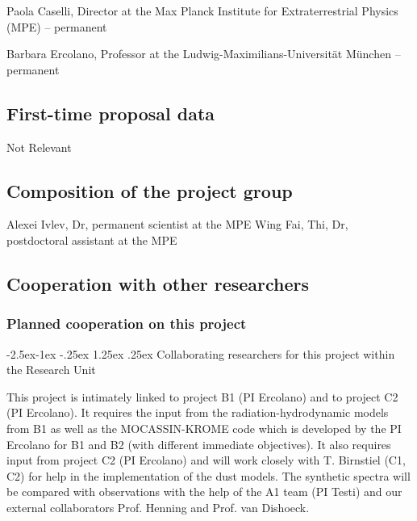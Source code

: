\documentclass[10pt,fleqn,twoside]{article}
\makeatletter
\newcommand{\Tcol}{\color{blue}}
\renewcommand\paragraph{\@startsection{paragraph}{4}{\z@}%
            {-2.5ex\@plus -1ex \@minus -.25ex}%
            {1.25ex \@plus .25ex}%
            {\normalfont\normalsize\bfseries}}
\makeatother
\begin{document}
Paola Caselli, Director at the Max Planck Institute for Extraterrestrial Physics (MPE) -- permanent 

Barbara Ercolano, Professor at the Ludwig-Maximilians-Universit\"at
M\"unchen -- permanent

\subsection{\Tcol First-time proposal data}

Not Relevant

\subsection{\Tcol Composition of the project group}

Alexei Ivlev, Dr, permanent scientist at the MPE 
Wing Fai, Thi, Dr, postdoctoral assistant at the MPE

\subsection{\Tcol Cooperation with other researchers}

\subsubsection{\Tcol Planned cooperation on this project}

\paragraph{\Tcol Collaborating researchers for this project within the
  Research Unit}

This project is intimately linked to project B1 (PI Ercolano) and to project C2 (PI Ercolano). 
It requires the input from the radiation-hydrodynamic models from B1 as well as the MOCASSIN-KROME code which is developed by the PI Ercolano for B1 and B2 (with different immediate objectives). It also requires input from project C2 (PI Ercolano) and will work closely with T. Birnstiel (C1, C2) for help in the implementation of the dust models. The synthetic spectra will be compared with observations with the help of the A1 team (PI Testi) and our external collaborators Prof. Henning and Prof. van Dishoeck. 
\end{document}
